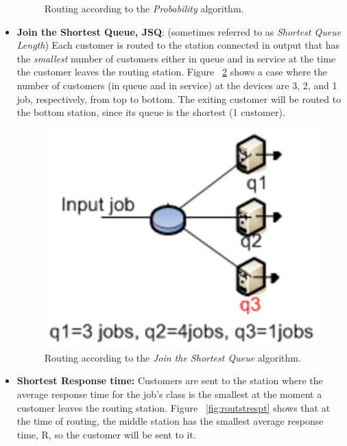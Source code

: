\begin{itemize}
\begin{figure}[h!]
\begin{center}
    \end{center}
    \caption{Routing according to the \emph{Probability} algorithm.}
    \label{fig:routexe}
\end{figure}
\item \textbf{Join the Shortest Queue, JSQ}: (sometimes referred
to as \emph{Shortest Queue Length}) Each customer is routed to the
station connected in output that has the \emph{smallest} number of
customers either in queue and in service at the time the customer
leaves the routing station. Figure ~\ref{fig:routsql} shows a case
where the number of customers (in queue and in service) at the
devices are 3, 2, and 1 job, respectively, from top to bottom. The
exiting customer will be routed to the bottom station, since its
queue is the shortest (1 customer).
\begin{figure}[htb]
    \begin{center}
        \includegraphics[scale=.5]{img/jsimg/8.11.eps}
    \end{center}
    \caption{Routing according to the \emph{Join the Shortest Queue} algorithm.}
    \label{fig:routsql}
\end{figure}
\item \textbf{Shortest Response time:} Customers are sent to the
station where the average response time for the job's class is the
smallest at the moment a customer leaves the routing station.
Figure ~\ref{fig:routstrespt} shows that at the time of routing,
the middle station has the smallest average response time, R, so
the customer will be sent to it.
\begin{figure}[htb]

\end{figure}
\end{itemize}
